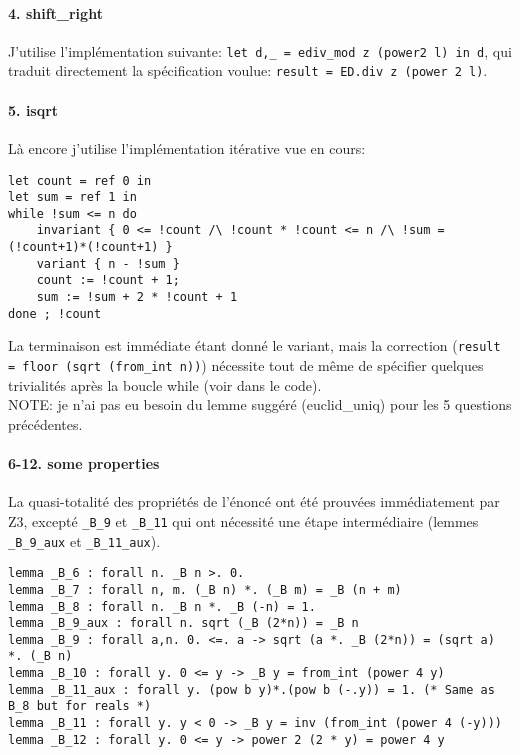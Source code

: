\documentclass[a4paper]{article}%
\begin{document}
	\paragraph{4. shift\_right}
	J'utilise l'implémentation suivante: \texttt{let d,_ = ediv_mod z (power2 l) in d},
	qui traduit directement la spécification voulue: \texttt{result = ED.div z (power 2 l)}.
	
	\paragraph{5. isqrt}
	Là encore j'utilise l'implémentation itérative vue en cours:
	\begin{verbatim}
let count = ref 0 in
let sum = ref 1 in
while !sum <= n do
	invariant { 0 <= !count /\ !count * !count <= n /\ !sum = (!count+1)*(!count+1) }
	variant { n - !sum }
	count := !count + 1;
	sum := !sum + 2 * !count + 1
done ; !count
	\end{verbatim}
	La terminaison est immédiate étant donné le variant,
	mais la correction (\texttt{result = floor (sqrt (from_int n))}) nécessite tout de même
	de spécifier quelques trivialités après la boucle while (voir dans le code).\\

	NOTE: je n'ai pas eu besoin du lemme suggéré (euclid\_uniq) pour les 5 questions précédentes.

	\paragraph{6-12. some properties} La quasi-totalité des propriétés de l'énoncé ont été prouvées
	immédiatement par Z3, excepté \texttt{_B_9} et \texttt{_B_11} qui ont
	nécessité une étape intermédiaire (lemmes \texttt{_B_9_aux} et \texttt{_B_11_aux}).
	\begin{verbatim}
lemma _B_6 : forall n. _B n >. 0.
lemma _B_7 : forall n, m. (_B n) *. (_B m) = _B (n + m)
lemma _B_8 : forall n. _B n *. _B (-n) = 1.
lemma _B_9_aux : forall n. sqrt (_B (2*n)) = _B n
lemma _B_9 : forall a,n. 0. <=. a -> sqrt (a *. _B (2*n)) = (sqrt a) *. (_B n)
lemma _B_10 : forall y. 0 <= y -> _B y = from_int (power 4 y)
lemma _B_11_aux : forall y. (pow b y)*.(pow b (-.y)) = 1. (* Same as B_8 but for reals *)
lemma _B_11 : forall y. y < 0 -> _B y = inv (from_int (power 4 (-y)))
lemma _B_12 : forall y. 0 <= y -> power 2 (2 * y) = power 4 y
	\end{verbatim}
\end{document}
